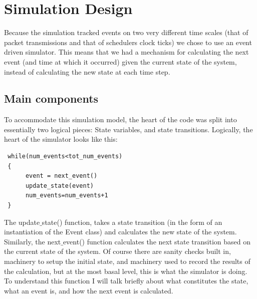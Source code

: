 \documentclass[11pt]{article}%
\begin{document}

\label{bib}
{}
 
 \newpage
\appendix
 \section{Simulation Design} \label{code_design}
 
 Because the simulation tracked events on two very different time scales (that of packet transmissions and that of schedulers clock ticks) we chose to use an event driven simulator.  This means that we had a mechanism for calculating the next event (and time at which it occurred) given the current state of the system, instead of calculating the new state at each time step.
 
 \subsection{Main components}
 To accommodate this simulation model, the heart of the code was split into essentially two logical pieces: State variables, and state transitions.  Logically, the heart of the simulator looks like this:
 \begin{verbatim}
 while(num_events<tot_num_events)
 {
      event = next_event()
      update_state(event)
      num_events=num_events+1
 }
 \end{verbatim}
 The update$\_$state() function, takes a state transition (in the form of an instantiation of the Event class) and calculates the new state of the system.  Similarly, the next$\_$event() function calculates the next state transition based on the current state of the system.  Of course there are sanity checks built in, machinery to setup the initial state, and machinery used to record the results of the calculation, but at the most basal level, this is what the simulator is doing.  To understand this function I will talk briefly about what constitutes the state, what an event is, and how the next event is calculated.
 
\end{document}
